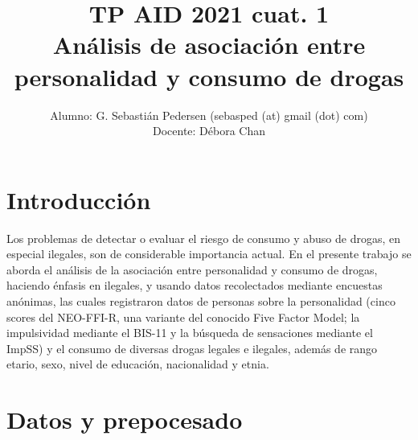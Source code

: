 \documentclass[a4paper,twocolumn]{article}
\title{TP AID 2021 cuat. 1\\ Análisis de asociación entre personalidad y consumo de drogas }
\author{Alumno: G. Sebastián Pedersen {\small (sebasped (at) gmail (dot) com)}\\ Docente: Débora Chan }
\date{}
\begin{document}

	
\maketitle

\tableofcontents	



\section{Introducción}
Los problemas de detectar o evaluar el riesgo de consumo y abuso de drogas, en especial ilegales, son de considerable importancia actual. En el presente trabajo se aborda el análisis de la asociación entre personalidad y consumo de drogas, haciendo énfasis en ilegales, y usando datos recolectados mediante encuestas anónimas, las cuales registraron  datos de personas sobre la personalidad (cinco scores del NEO-FFI-R, una variante del conocido Five Factor Model; la impulsividad mediante el BIS-11 y la búsqueda de sensaciones mediante el ImpSS) y el consumo de diversas drogas legales e ilegales, además de rango etario, sexo, nivel de educación, nacionalidad y etnia. 



\section{Datos y prepocesado}
\end{document}
